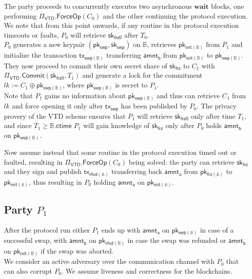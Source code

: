 \documentclass{article}      	%
\begin{document}
The party proceeds to concurrently executes two asynchronous $\textbf{wait}$ blocks, one performing $\Pi_{\mathsf{VTD}}.\mathsf{ForceOp}(C_0)$ and the other continuing the protocol execution. We note that from this point onwards, if any routine in the protocol execution timeouts or faults, $P_0$ will retrieve $\mathsf{sk_{frz0}}$ after $T_0$. \\
$P_0$ generates a new keypair $(\mathsf{pk_{swp}}, \mathsf{sk_{swp}})$ on $\mathbb{B}$, retrieves $\mathsf{pk_{init(\mathbb{B})}}$ from $P_1$ and  initialize the transaction $\mathsf{tx_{swp(\mathbb{B})}}$ transferring $\mathsf{amnt_b}$ from $\mathsf{pk_{init(\mathbb{B})}}$ to $\mathsf{pk_{swp(\mathbb{B})}}$.
They now proceed to commit their own secret share of $\mathsf{sk_{frz}}$ to $C_1$ with $\Pi_\mathsf{VTD}.\mathsf{Commit}(\mathsf{sk_{frz0}}, T_1)$ and generate a lock for the commitment $lk := C_1 \oplus \mathsf{pk_{swp(\mathbb{B})}}$, where $\mathsf{pk_{swp(\mathbb{B})}}$ is secret to $P_1$. \\
Note that $P_1$ gains no information about $\mathsf{pk_{swp(\mathbb{B})}}$ and thus can retrieve $C_1$ from $lk$ and force opening it only after $\mathsf{tx_{swp}}$ has been published by $P_0$. The privacy provery of the VTD scheme ensures that $P_1$ will retrieve $\mathsf{sk_{frz0}}$ only after time $T_1$, and since $T_1 \geq \mathbb{B}.\mathsf{ctime}$ $P_1$ will gain knowledge of $\mathsf{sk_{frz}}$ only after $P_0$ holds $\mathsf{amnt_b}$ on $\mathsf{pk_{swp(\mathbb{B})}}$.

Now assume instead that some routine in the protocol execution timed out or faulted, resulting in $\Pi_{\mathsf{VTD}}.\mathsf{ForceOp}(C_0)$ being solved: the party can retrieve $\mathsf{sk_{frz}}$ and they sign and publish $\mathsf{tx_{rfnd(\mathbb{A})}}$ transferring back $\mathsf{amnt_a}$ from $\mathsf{pk_{frz(\mathbb{A})}}$ to $\mathsf{pk_{init(\mathbb{A})}}$, thus resulting in $P_0$ holding $\mathsf{amnt_a}$ on $\mathsf{pk_{init(\mathbb{A})}}$.


\subsection{Party $P_1$}
After the protocol run either $P_1$ ends up with $\mathsf{amnt_a}$ on $\mathsf{pk_{swp(\mathbb{A})}}$ in case of a successful swap, with $\mathsf{amnt_b}$ on $\mathsf{pk_{rfnd(\mathbb{B})}}$ in case the swap was refunded or $\mathsf{amnt_b}$ on $\mathsf{pk_{init(\mathbb{B})}}$ if the swap was aborted. \\
We consider an active adversary over the communication channel with $P_0$ that can also corrupt $P_0$. We assume liveness and correctness for the blockchains.\\
\end{document}

